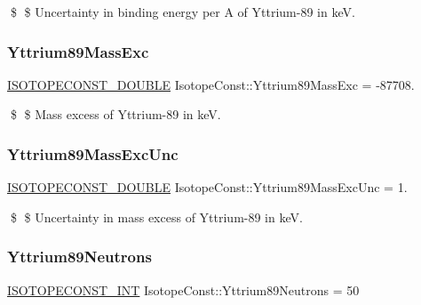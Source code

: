 \$ \$ Uncertainty in binding energy per A of Yttrium-\/89 in keV. \mbox{\label{group___isotope_const-_yttrium-_y89_ga967d52eaa35bfc2abf1818ae1f2d9e23}} 
\subsubsection{\texorpdfstring{Yttrium89\+Mass\+Exc}{Yttrium89MassExc}}
{\footnotesize\ttfamily \mbox{\hyperlink{group___isotope_const-_macros_ga8f45a7272ce02c0b4c65c44636ed719a}{I\+S\+O\+T\+O\+P\+E\+C\+O\+N\+S\+T\+\_\+\+D\+O\+U\+B\+LE}} Isotope\+Const\+::\+Yttrium89\+Mass\+Exc = -\/87708.}

\$ \$ Mass excess of Yttrium-\/89 in keV. \mbox{\label{group___isotope_const-_yttrium-_y89_ga209fe4a0cfd61ab9266b3f00703592dd}} 
\subsubsection{\texorpdfstring{Yttrium89\+Mass\+Exc\+Unc}{Yttrium89MassExcUnc}}
{\footnotesize\ttfamily \mbox{\hyperlink{group___isotope_const-_macros_ga8f45a7272ce02c0b4c65c44636ed719a}{I\+S\+O\+T\+O\+P\+E\+C\+O\+N\+S\+T\+\_\+\+D\+O\+U\+B\+LE}} Isotope\+Const\+::\+Yttrium89\+Mass\+Exc\+Unc = 1.}

\$ \$ Uncertainty in mass excess of Yttrium-\/89 in keV. \mbox{\label{group___isotope_const-_yttrium-_y89_gade61dd655f1c74c8f0a1508120f0309d}} 
\subsubsection{\texorpdfstring{Yttrium89\+Neutrons}{Yttrium89Neutrons}}
{\footnotesize\ttfamily \mbox{\hyperlink{group___isotope_const-_macros_ga5f18360b3e99483a35c32d789e62621c}{I\+S\+O\+T\+O\+P\+E\+C\+O\+N\+S\+T\+\_\+\+I\+NT}} Isotope\+Const\+::\+Yttrium89\+Neutrons = 50}

